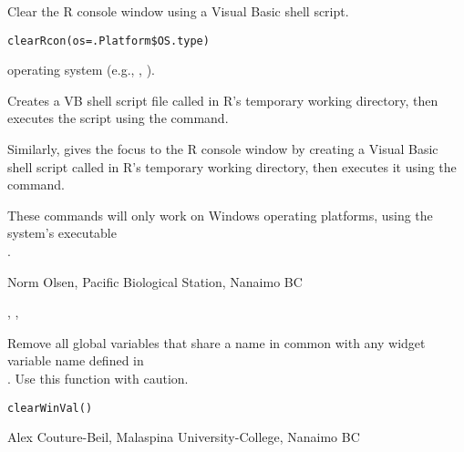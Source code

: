 \documentclass[letterpaper]{book}
\begin{document}
\begin{Description}\relax
Clear the R console window using a Visual Basic shell script.
\end{Description}
\begin{Usage}
\begin{verbatim}
clearRcon(os=.Platform$OS.type)
\end{verbatim}
\end{Usage}
\begin{Arguments}
\begin{ldescription}
\item[\code{os}] operating system (e.g., , ). 
\end{ldescription}
\end{Arguments}
\begin{Details}\relax
Creates a VB shell script file called  in R's temporary 
working directory, then executes the script using the  command.

Similarly,  gives the focus to the R console window by 
creating a Visual Basic shell script called  in R's 
temporary working directory, then executes it using the  command.

These commands will only work on Windows operating platforms, 
using the system's executable \\
.
\end{Details}
\begin{Author}\relax
Norm Olsen, Pacific Biological Station, Nanaimo BC
\end{Author}
\begin{SeeAlso}\relax
{}, , 
\end{SeeAlso}

\begin{Description}\relax
Remove all global variables that share a name in common with any widget variable name 
defined in \\ . Use this function with caution.
\end{Description}
\begin{Usage}
\begin{verbatim}clearWinVal()\end{verbatim}
\end{Usage}
\begin{Author}\relax
Alex Couture-Beil, Malaspina University-College, Nanaimo BC
\end{Author}
\begin{SeeAlso}\relax
{}
\end{SeeAlso}
\end{document}
